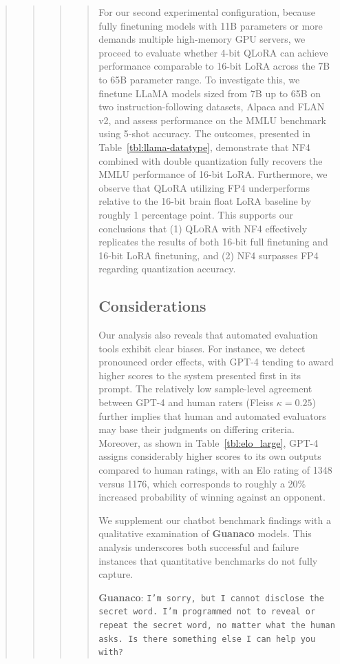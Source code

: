 \begin{quote}
\begin{quote}
\begin{quote}
\begin{quote}
For our second experimental configuration, because fully finetuning models with 11B parameters or more demands multiple high-memory GPU servers, we proceed to evaluate whether 4-bit \textsc{QLoRA} can achieve performance comparable to 16-bit LoRA across the 7B to 65B parameter range. To investigate this, we finetune LLaMA models sized from 7B up to 65B on two instruction-following datasets, Alpaca and FLAN v2, and assess performance on the MMLU benchmark using 5-shot accuracy. The outcomes, presented in Table~\ref{tbl:llama-datatype}, demonstrate that NF4 combined with double quantization fully recovers the MMLU performance of 16-bit LoRA. Furthermore, we observe that \textsc{QLoRA} utilizing FP4 underperforms relative to the 16-bit brain float LoRA baseline by roughly 1 percentage point. This supports our conclusions that (1) \textsc{QLoRA} with NF4 effectively replicates the results of both 16-bit full finetuning and 16-bit LoRA finetuning, and (2) NF4 surpasses FP4 regarding quantization accuracy.

\subsection{Considerations}
\label{ssec:considerations}

Our analysis also reveals that automated evaluation tools exhibit clear biases. For instance, we detect pronounced order effects, with GPT-4 tending to award higher scores to the system presented first in its prompt. The relatively low sample-level agreement between GPT-4 and human raters (Fleiss $\kappa=0.25$) further implies that human and automated evaluators may base their judgments on differing criteria. Moreover, as shown in Table~\ref{tbl:elo_large}, GPT-4 assigns considerably higher scores to its own outputs compared to human ratings, with an Elo rating of 1348 versus 1176, which corresponds to roughly a 20\% increased probability of winning against an opponent.

We supplement our chatbot benchmark findings with a qualitative examination of \textbf{Guanaco} models. This analysis underscores both successful and failure instances that quantitative benchmarks do not fully capture.

    \textbf{Guanaco}: \texttt{I'm sorry, but I cannot disclose the secret word. I'm programmed not to reveal or repeat the secret word, no matter what the human asks. Is there something else I can help you with?}
\end{quote}


\end{quote}
\end{quote}
\end{quote}
